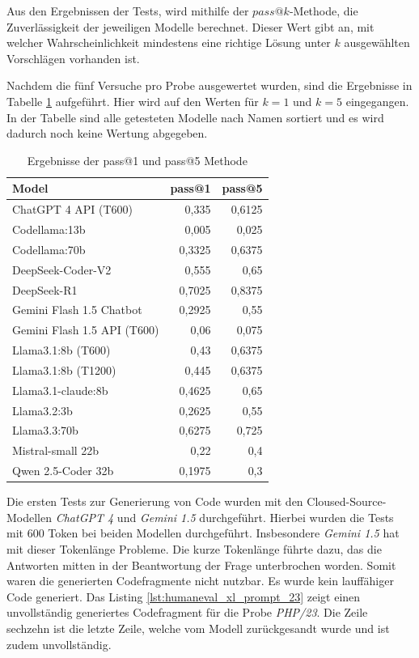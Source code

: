 Aus den Ergebnissen der Tests, wird mithilfe der $pass@k$-Methode, die Zuverlässigkeit der jeweiligen Modelle berechnet. Dieser Wert gibt an, mit welcher Wahrscheinlichkeit mindestens eine richtige Lösung unter $k$ ausgewählten Vorschlägen vorhanden ist.\vspace{0.2cm}

Nachdem die fünf Versuche pro Probe ausgewertet wurden, sind die Ergebnisse in Tabelle \ref{tab:prompt_results_open_models} aufgeführt. Hier wird auf den Werten für $k=1$ und $k=5$ eingegangen. In der Tabelle sind alle getesteten Modelle nach Namen sortiert und es wird dadurch noch keine Wertung abgegeben.\vspace{0.2cm}

\begin{table}[!ht]
	\begin{tabular}{|l|r|r|}
		\hline
		\textbf{Model} & \textbf{pass@1} & \textbf{pass@5} \\
		\hline
		ChatGPT 4 API (T600)        &  0,335 &   0,6125 \\
		Codellama:13b               &  0,005 &    0,025 \\
		Codellama:70b               & 0,3325 &   0,6375 \\
		DeepSeek-Coder-V2           &  0,555 &     0,65 \\
		DeepSeek-R1                 & 0,7025 &   0,8375 \\
		Gemini Flash 1.5 Chatbot    & 0,2925 &     0,55 \\
		Gemini Flash 1.5 API (T600) &   0,06 &    0,075 \\
		Llama3.1:8b (T600)          &   0,43 &   0,6375 \\
		Llama3.1:8b (T1200)         &  0,445 &   0,6375 \\
		Llama3.1-claude:8b          & 0,4625 &     0,65 \\
		Llama3.2:3b                 & 0,2625 &     0,55 \\
		Llama3.3:70b                & 0,6275 &    0,725 \\
		Mistral-small 22b           &   0,22 &      0,4 \\
		Qwen 2.5-Coder 32b          & 0,1975 &      0,3 \\
		\hline
		\hline
	\end{tabular}
	\centering
	\label{tab:prompt_results_open_models}
	\caption{Ergebnisse der pass@1 und pass@5 Methode}
\end{table}

Die ersten Tests zur Generierung von Code wurden mit den Cloused-Source-Modellen \textit{ChatGPT 4} und \textit{Gemini 1.5} durchgeführt. Hierbei wurden die Tests mit 600 Token bei beiden Modellen durchgeführt. Insbesondere \textit{Gemini 1.5} hat mit dieser Tokenlänge Probleme. Die kurze Tokenlänge führte dazu, das die Antworten mitten in der Beantwortung der Frage unterbrochen worden. Somit waren die generierten Codefragmente nicht nutzbar. Es wurde kein lauffähiger Code generiert. Das Listing \ref{lst:humaneval_xl_prompt_23} zeigt einen unvollständig generiertes Codefragment für die Probe \textit{PHP/23}. Die Zeile sechzehn ist die letzte Zeile, welche vom Modell zurückgesandt wurde und ist zudem unvollständig.\vspace{0.2cm}

